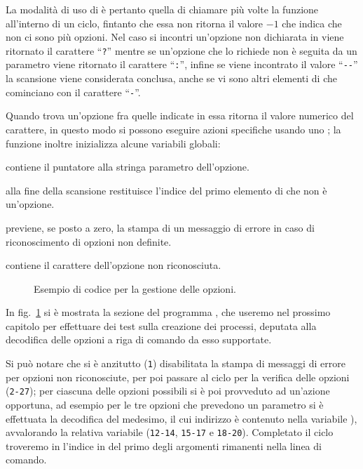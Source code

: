 La modalità di uso di  è pertanto quella di chiamare più volte la
funzione all'interno di un ciclo, fintanto che essa non ritorna il valore $-1$
che indica che non ci sono più opzioni. Nel caso si incontri un'opzione non
dichiarata in  viene ritornato il carattere ``\texttt{?}''
mentre se un'opzione che lo richiede non è seguita da un parametro viene
ritornato il carattere ``\texttt{:}'', infine se viene incontrato il valore
``\texttt{-{}-}'' la scansione viene considerata conclusa, anche se vi sono
altri elementi di  che cominciano con il carattere ``\texttt{-}''.

Quando  trova un'opzione fra quelle indicate in 
essa ritorna il valore numerico del carattere, in questo modo si possono
eseguire azioni specifiche usando uno ; la funzione
inoltre inizializza alcune variabili globali:
\begin{itemize*}
\item {} contiene il puntatore alla stringa parametro
  dell'opzione.
\item {} alla fine della scansione restituisce l'indice del
  primo elemento di  che non è un'opzione.
\item {} previene, se posto a zero, la stampa di un messaggio
  di errore in caso di riconoscimento di opzioni non definite.
\item {} contiene il carattere dell'opzione non riconosciuta.
\end{itemize*}

\begin{figure}[!htb]
  \footnotesize \centering
  \begin{minipage}[c]{\codesamplewidth}
  \end{minipage}
  \normalsize
  \caption{Esempio di codice per la gestione delle opzioni.}
  \label{fig:proc_options_code}
\end{figure}

In fig.~\ref{fig:proc_options_code} si è mostrata la sezione del programma
, che useremo nel prossimo capitolo per effettuare dei test
sulla creazione dei processi, deputata alla decodifica delle opzioni a riga di
comando da esso supportate.

Si può notare che si è anzitutto (\texttt{\small 1}) disabilitata la stampa di
messaggi di errore per opzioni non riconosciute, per poi passare al ciclo per
la verifica delle opzioni (\texttt{\small 2-27}); per ciascuna delle opzioni
possibili si è poi provveduto ad un'azione opportuna, ad esempio per le tre
opzioni che prevedono un parametro si è effettuata la decodifica del medesimo,
il cui indirizzo è contenuto nella variabile ), avvalorando la
relativa variabile (\texttt{\small 12-14}, \texttt{\small 15-17} e
\texttt{\small 18-20}). Completato il ciclo troveremo in 
l'indice in  del primo degli argomenti rimanenti nella linea di
comando.

